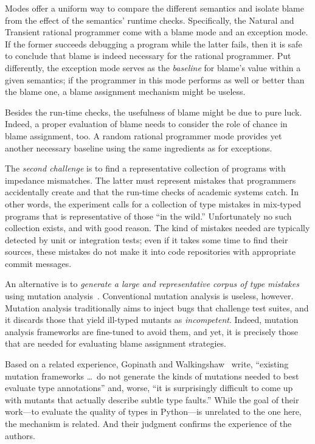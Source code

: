 Modes offer a uniform way to compare the different semantics and  isolate
blame from the effect of the semantics' runtime checks. Specifically, the Natural and
Transient rational programmer come with a blame mode and an exception
mode. If the former succeeds debugging a program while the latter
fails, then it is safe to conclude that blame is indeed necessary for the
rational programmer. Put differently, the exception mode serves as the
{\em baseline\/} for blame's value within a given semantics; if the
programmer in this mode performs as well or better than the  blame one, a blame assignment
mechanism might be useless.

Besides the run-time checks, the usefulness of blame might be due to pure luck.
Indeed, a proper evaluation of blame needs to consider the role of chance in blame assignment, too.
A random rational programmer mode provides yet another necessary baseline using the same ingredients as for exceptions. 

The {\em second challenge\/} is to find a representative collection of
programs with impedance mismatches. The latter must represent mistakes that programmers
accidentally create and that the run-time checks of academic systems catch. In
other words, the experiment calls for a collection of type mistakes in
mix-typed programs that is representative of those ``in the wild.''
Unfortunately no such collection exists, and with good reason. The kind of
mistakes needed are typically detected by unit or integration tests; even if it
takes some time to find their sources, these mistakes do not make it into code
repositories with appropriate commit messages.

An alternative is to {\em generate a large and representative corpus of type
mistakes \/} using mutation analysis~\cite{lipton1971fault, demillo1978hints,
jia2011analysis}. Conventional mutation analysis is useless, however.  Mutation
analysis traditionally aims to inject bugs that challenge test suites, and it
discards those that yield ill-typed mutants as \emph{incompetent}. Indeed,
mutation analysis frameworks are fine-tuned to avoid them, and yet, it is
precisely those that are needed for evaluating blame assignment strategies.

Based on a related experience, Gopinath and Walkingshaw~\cite{gw-mutation} write,
``existing mutation frameworks \ldots\ do not generate the kinds of mutations
needed to best evaluate type annotations'' and, worse, ``it is surprisingly
difficult to come up with mutants that actually describe subtle type faults.''
While the goal of their work---to evaluate the quality of types in
Python---is unrelated to the one here, the mechanism is related. And their
judgment confirms the experience of the authors. 

